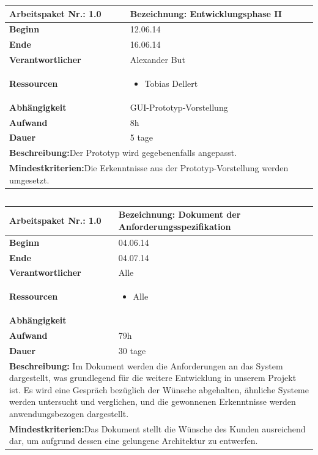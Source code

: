 \documentclass[fontsize=12pt,paper=a4,twoside]{scrartcl}
\begin{document}
\begin{tabular}{|p{5.3cm}|p{9.7cm}|}\hline
	\textbf{Arbeitspaket Nr.:} 1.0 & \textbf{Bezeichnung:} Entwicklungsphase II\\ \hline \hline
	\textbf{Beginn} & 12.06.14\\ \hline
	\textbf{Ende} & 16.06.14\\ \hline
	\textbf{Verantwortlicher} & Alexander But\\ \hline
	\textbf{Ressourcen} & \begin{itemize}
		\item Tobias Dellert
	\end{itemize}    \\ \hline
	\textbf{Abhängigkeit} & GUI-Prototyp-Vorstellung\\ \hline
	\textbf{Aufwand} & 8h\\ \hline
	\textbf{Dauer} & 5 tage\\ \hline
	\multicolumn{2}{|p{15cm}|}{\textbf{Beschreibung:}\newline  Der Prototyp wird gegebenenfalls angepasst. }\\ \hline
	\multicolumn{2}{|p{15cm}|}{\textbf{Mindestkriterien:}\newline Die Erkenntnisse aus der Prototyp-Vorstellung werden umgesetzt.}\\ \hline
\end{tabular}

\begin{verbatim} 
\end{verbatim}

\begin{tabular}{|p{5.3cm}|p{9.7cm}|}\hline
	\textbf{Arbeitspaket Nr.:} 1.0 & \textbf{Bezeichnung:} Dokument der Anforderungsspezifikation\\ \hline \hline
	\textbf{Beginn} & 04.06.14\\ \hline
	\textbf{Ende} & 04.07.14\\ \hline
	\textbf{Verantwortlicher} & Alle\\ \hline
		\textbf{Ressourcen} & \begin{itemize}
			\item Alle
		\end{itemize}    \\ \hline
		\textbf{Abhängigkeit} &\\ \hline
		\textbf{Aufwand} & 79h\\ \hline
		\textbf{Dauer} & 30 tage\\ \hline
		\multicolumn{2}{|p{15cm}|}{\textbf{Beschreibung:} Im Dokument werden die Anforderungen an das System dargestellt, was grundlegend für die weitere Entwicklung in unserem Projekt ist. Es wird eine Gespräch bezüglich der Wünsche abgehalten, ähnliche Systeme werden untersucht und verglichen, und die gewonnenen Erkenntnisse werden anwendungsbezogen dargestellt.\newline   }\\ \hline
		\multicolumn{2}{|p{15cm}|}{\textbf{Mindestkriterien:}\newline Das Dokument stellt die Wünsche des Kunden ausreichend dar, um aufgrund dessen eine gelungene Architektur zu entwerfen.}\\ \hline
	\end{tabular}
	
\end{document}
